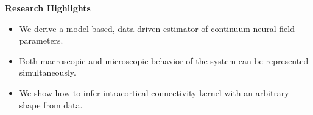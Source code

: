 \documentclass[]{article}
\begin{document}
\textbf{Research Highlights}
\begin{itemize}
	\item We derive a model-based, data-driven estimator of continuum neural field parameters.
	\item Both macroscopic and microscopic behavior of the system can be represented simultaneously.
	\item We show how to infer intracortical connectivity kernel with an arbitrary shape from data.
\end{itemize}
\end{document}
